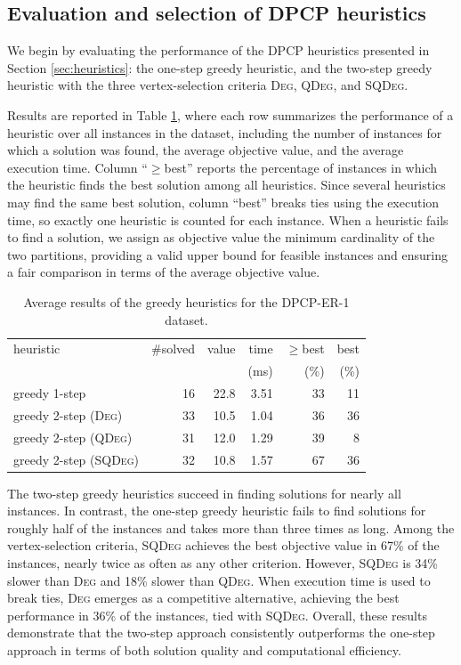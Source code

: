 \documentclass[preprint, 11pt, authoryear]{elsarticle}
\begin{document}
\subsection{Evaluation and selection of DPCP heuristics}

We begin by evaluating the performance of the DPCP heuristics presented in Section \ref{sec:heuristics}: the one-step greedy heuristic, and the two-step greedy heuristic with the three vertex-selection criteria \textsc{Deg}, \textsc{QDeg}, and \textsc{SQDeg}. 

Results are reported in Table \ref{table.results.heur}, where each row summarizes the performance of a heuristic over all instances in the dataset, including the number of instances for which a solution was found, the average objective value, and the average execution time. 
Column ``$\geq$best'' reports the percentage of instances in which the heuristic finds the best solution among all heuristics. Since several heuristics may find the same best solution, column ``best'' breaks ties using the execution time, so exactly one heuristic is counted for each instance.
When a heuristic fails to find a solution, we assign as objective value the minimum cardinality of the two partitions, providing a valid upper bound for feasible instances and ensuring a fair comparison in terms of the average objective value.

\begin{table}
\centering
\small
\begin{tabular}{lrrrrr}
\toprule
heuristic & \#solved & value & time & $\geq$best & best \\
& & & (ms) & (\%) & (\%) \\
\midrule
greedy 1-step & 16 & 22.8 & 3.51 & 33 & 11 \\
greedy 2-step (\textsc{Deg}) & 33 & 10.5 & 1.04 & 36 & 36 \\
greedy 2-step (\textsc{QDeg}) & 31 & 12.0 & 1.29 & 39 & 8 \\
greedy 2-step (\textsc{SQDeg}) & 32 & 10.8 & 1.57 & 67 & 36 \\
\bottomrule
\end{tabular}
\caption{Average results of the greedy heuristics for the DPCP-ER-1 dataset.}
\label{table.results.heur}
\end{table}

The two-step greedy heuristics succeed in finding solutions for nearly all instances. 
In contrast, the one-step greedy heuristic fails to find solutions for roughly half of the instances and takes more than three times as long.
Among the vertex-selection criteria, \textsc{SQDeg} achieves the best objective value in 67\% of the instances, nearly twice as often as any other criterion.
However, \textsc{SQDeg} is 34\% slower than \textsc{Deg} and 18\% slower than \textsc{QDeg}. When execution time is used to break ties, \textsc{Deg} emerges as a competitive alternative, achieving the best performance in 36\% of the instances, tied with \textsc{SQDeg}.
Overall, these results demonstrate that the two-step approach consistently outperforms the one-step approach in terms of both solution quality and computational efficiency.
\end{document}
